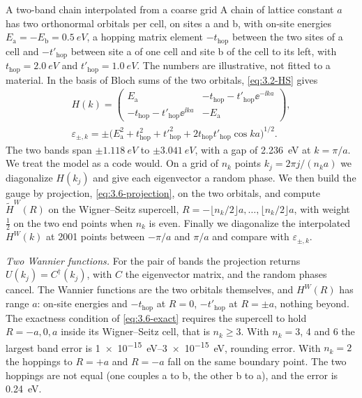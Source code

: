 \begin{workedexample}{A two-band chain interpolated from a coarse grid}\label{we:3-w1d}
A chain of lattice constant $a$ has two orthonormal orbitals per cell, on sites a and b, with on-site energies $E_{\mathrm{a}} = -E_{\mathrm{b}} = \SI{0.5}{eV}$, a hopping matrix element $-t_{\mathrm{hop}}$ between the two sites of a cell and $-t'_{\mathrm{hop}}$ between site a of one cell and site b of the cell to its left, with $t_{\mathrm{hop}} = \SI{2.0}{eV}$ and $t'_{\mathrm{hop}} = \SI{1.0}{eV}$. The numbers are illustrative, not fitted to a material. In the basis of Bloch sums of the two orbitals, \cref{eq:3.2-HS} gives
\begin{gather*}
  H(k) = \begin{pmatrix} E_{\mathrm{a}} & -t_{\mathrm{hop}} - t'_{\mathrm{hop}}\ee^{-\ii ka} \\ -t_{\mathrm{hop}} - t'_{\mathrm{hop}}\ee^{\ii ka} & -E_{\mathrm{a}} \end{pmatrix}, \\
  \varepsilon_{\pm,k} = \pm\bigl(E_{\mathrm{a}}^2 + t_{\mathrm{hop}}^2 + t'^2_{\mathrm{hop}} + 2t_{\mathrm{hop}}t'_{\mathrm{hop}}\cos ka\bigr)^{1/2} .
\end{gather*}
The two bands span $\pm\SI{1.118}{eV}$ to $\pm\SI{3.041}{eV}$, with a gap of \SI{2.236}{eV} at $k = \pi/a$. We treat the model as a code would. On a grid of $n_k$ points $k_j = 2\pi j/(n_ka)$ we diagonalize $H(k_j)$ and give each eigenvector a random phase. We then build the gauge by projection, \cref{eq:3.6-projection}, on the two orbitals, and compute $\tilde H^W(R)$ on the Wigner--Seitz supercell, $R = -\lfloor n_k/2\rfloor a, \dots, \lfloor n_k/2\rfloor a$, with weight $\frac12$ on the two end points when $n_k$ is even. Finally we diagonalize the interpolated $H^W(k)$ at 2001 points between $-\pi/a$ and $\pi/a$ and compare with $\varepsilon_{\pm,k}$.

\emph{Two Wannier functions.} For the pair of bands the projection returns $U(k_j) = C^\dagger(k_j)$, with $C$ the eigenvector matrix, and the random phases cancel. The Wannier functions are the two orbitals themselves, and $H^W(R)$ has range $a$: on-site energies and $-t_{\mathrm{hop}}$ at $R = 0$, $-t'_{\mathrm{hop}}$ at $R = \pm a$, nothing beyond. The exactness condition of \cref{eq:3.6-exact} requires the supercell to hold $R = -a, 0, a$ inside its Wigner--Seitz cell, that is $n_k \ge 3$. With $n_k = 3$, 4 and 6 the largest band error is \SIrange{1e-15}{3e-15}{eV}, rounding error. With $n_k = 2$ the hoppings to $R = +a$ and $R = -a$ fall on the same boundary point. The two hoppings are not equal (one couples a to b, the other b to a), and the error is \SI{0.24}{eV}.


\end{workedexample}
